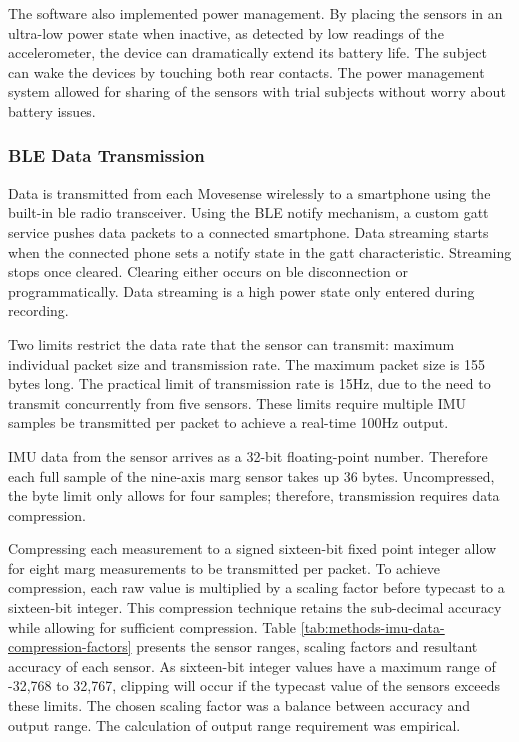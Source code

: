 The software also implemented power management. By placing the sensors in an ultra-low power state when inactive, as detected by low readings of the accelerometer, the device can dramatically extend its battery life. The subject can wake the devices by touching both rear contacts. The power management system allowed for sharing of the sensors with trial subjects without worry about battery issues.


\subsubsection{BLE Data Transmission} %
\label{subsection:methods-on-sensor-compression}
Data is transmitted from each Movesense wirelessly to a smartphone using the built-in \acrshort{ble} radio transceiver. Using the BLE notify mechanism, a custom \acrfull{gatt} service pushes data packets to a connected smartphone. Data streaming starts when the connected phone sets a notify state in the \acrshort{gatt} characteristic. Streaming stops once cleared. Clearing either occurs on \acrshort{ble} disconnection or programmatically. Data streaming is a high power state only entered during recording.

Two limits restrict the data rate that the sensor can transmit: maximum individual packet size and transmission rate. The maximum packet size is 155 bytes long. The practical limit of transmission rate is 15Hz, due to the need to transmit concurrently from five sensors. These limits require multiple IMU samples be transmitted per packet to achieve a real-time 100Hz output.

IMU data from the sensor arrives as a 32-bit floating-point number. Therefore each full sample of the nine-axis \acrshort{marg} sensor takes up 36 bytes. Uncompressed, the byte limit only allows for four samples; therefore, transmission requires data compression.

Compressing each measurement to a signed sixteen-bit fixed point integer allow for eight \acrshort{marg} measurements to be transmitted per packet. To achieve compression, each raw value is multiplied by a scaling factor before typecast to a sixteen-bit integer. This compression technique retains the sub-decimal accuracy while allowing for sufficient compression. Table \ref{tab:methods-imu-data-compression-factors} presents the sensor ranges, scaling factors and resultant accuracy of each sensor. As sixteen-bit integer values have a maximum range of -32,768 to 32,767, clipping will occur if the typecast value of the sensors exceeds these limits. The chosen scaling factor was a balance between accuracy and output range. The calculation of output range requirement was empirical.

